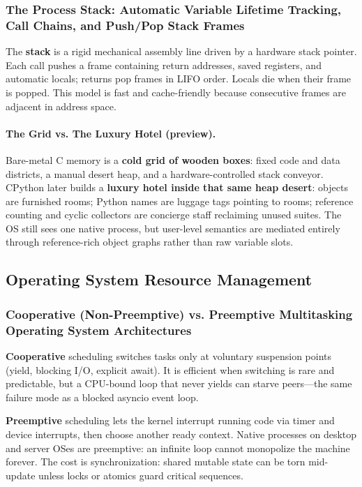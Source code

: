 \documentclass[a4paper,twoside]{report}
\begin{document}
\subsubsection{The Process Stack: Automatic Variable Lifetime Tracking, Call Chains, and Push/Pop Stack Frames}

The \textbf{stack} is a rigid mechanical assembly line driven by a hardware stack pointer. Each call pushes a frame containing return addresses, saved registers, and automatic locals; returns pop frames in LIFO order. Locals die when their frame is popped. This model is fast and cache-friendly because consecutive frames are adjacent in address space.

\paragraph{The Grid vs. The Luxury Hotel (preview).}
Bare-metal C memory is a \textbf{cold grid of wooden boxes}: fixed code and data districts, a manual desert heap, and a hardware-controlled stack conveyor. CPython later builds a \textbf{luxury hotel inside that same heap desert}: objects are furnished rooms; Python names are luggage tags pointing to rooms; reference counting and cyclic collectors are concierge staff reclaiming unused suites. The OS still sees one native process, but user-level semantics are mediated entirely through reference-rich object graphs rather than raw variable slots.


\subsection{Operating System Resource Management}

\subsubsection{Cooperative (Non-Preemptive) vs. Preemptive Multitasking Operating System Architectures}

\textbf{Cooperative} scheduling switches tasks only at voluntary suspension points (yield, blocking I/O, explicit await). It is efficient when switching is rare and predictable, but a CPU-bound loop that never yields can starve peers---the same failure mode as a blocked asyncio event loop.

\textbf{Preemptive} scheduling lets the kernel interrupt running code via timer and device interrupts, then choose another ready context. Native processes on desktop and server OSes are preemptive: an infinite loop cannot monopolize the machine forever. The cost is synchronization: shared mutable state can be torn mid-update unless locks or atomics guard critical sequences.
\end{document}
